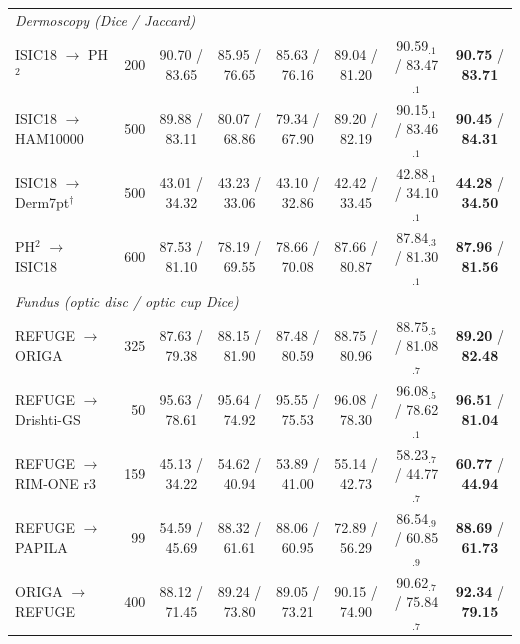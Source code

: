 \documentclass{article}
\newcommand{\B}[1]{\textbf{#1}}
\begin{document}
\begin{table}[t]
\begin{tabular}{lrcccccc}
\multicolumn{8}{l}{\emph{Dermoscopy (Dice / Jaccard)}}\\
 ISIC18 $\to$ PH$^2$ & 200 & 90.70 / 83.65 & 85.95 / 76.65 & 85.63 / 76.16 & 89.04 / 81.20 & 90.59$_{.1}$ / 83.47$_{.1}$ & \B{90.75} / \B{83.71} \\
 ISIC18 $\to$ HAM10000 & 500 & 89.88 / 83.11 & 80.07 / 68.86 & 79.34 / 67.90 & 89.20 / 82.19 & 90.15$_{.1}$ / 83.46$_{.1}$ & \B{90.45} / \B{84.31} \\
 ISIC18 $\to$ Derm7pt$^\dagger$ & 500 & 43.01 / 34.32 & 43.23 / 33.06 & 43.10 / 32.86 & 42.42 / 33.45 & 42.88$_{.1}$ / 34.10$_{.1}$ & \B{44.28} / \B{34.50} \\
 PH$^2$ $\to$ ISIC18 & 600 & 87.53 / 81.10 & 78.19 / 69.55 & 78.66 / 70.08 & 87.66 / 80.87 & 87.84$_{.3}$ / 81.30$_{.1}$ & \B{87.96} / \B{81.56} \\
\midrule
\multicolumn{8}{l}{\emph{Fundus (optic disc / optic cup Dice)}}\\
 REFUGE $\to$ ORIGA      & 325 & 87.63 / 79.38 & 88.15 / 81.90 & 87.48 / 80.59 & 88.75 / 80.96 & 88.75$_{.5}$ / 81.08$_{.7}$ & \B{89.20} / \B{82.48} \\
 REFUGE $\to$ Drishti-GS &  50 & 95.63 / 78.61 & 95.64 / 74.92 & 95.55 / 75.53 & 96.08 / 78.30 & 96.08$_{.5}$ / 78.62$_{.1}$ & \B{96.51} / \B{81.04} \\
 REFUGE $\to$ RIM-ONE r3 & 159 & 45.13 / 34.22 & 54.62 / 40.94 & 53.89 / 41.00 & 55.14 / 42.73 & 58.23$_{.7}$ / 44.77$_{.7}$ & \B{60.77} / \B{44.94} \\
 REFUGE $\to$ PAPILA     &  99 & 54.59 / 45.69 & 88.32 / 61.61 & 88.06 / 60.95 & 72.89 / 56.29 & 86.54$_{.9}$ / 60.85$_{.9}$ & \B{88.69} / \B{61.73} \\
 ORIGA $\to$ REFUGE      & 400 & 88.12 / 71.45 & 89.24 / 73.80 & 89.05 / 73.21 & 90.15 / 74.90 & 90.62$_{.7}$ / 75.84$_{.7}$ & \B{92.34} / \B{79.15} \\
\bottomrule
\end{tabular}
\end{table}
\end{document}
